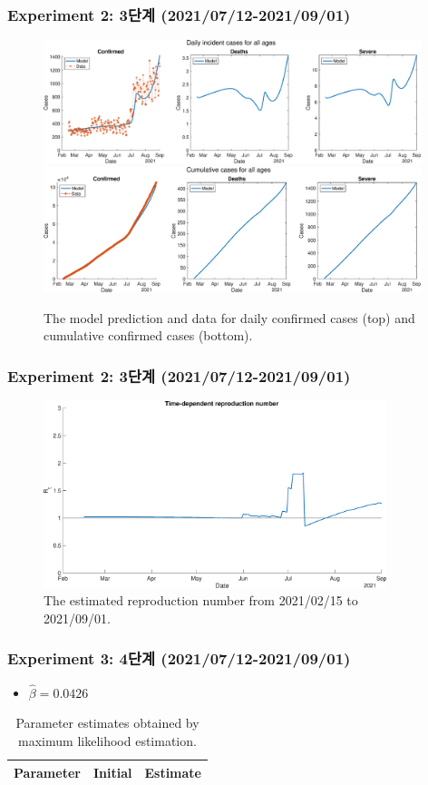 \documentclass[aspectratio=169, 9pt, xcolor=dvipsnames]{beamer}
\begin{document}
	\begin{frame}\frametitle{Experiment 2: 3단계 (2021/07/12-2021/09/01)}
	    \begin{figure}
	    	\centering
	    	\includegraphics[width=11cm]{../results/estimate_sd_2nd_2/daily_all_age.eps}
	    	\includegraphics[width=11cm]{../results/estimate_sd_2nd_2/cumul_all_age.eps}
	    	\caption{The model prediction and data for daily confirmed cases (top) and cumulative confirmed cases (bottom).}
	    \end{figure}
	\end{frame}

	\begin{frame}\frametitle{Experiment 2: 3단계 (2021/07/12-2021/09/01)}
	    \begin{figure}
	    	\centering
	    	\includegraphics[width=10cm]{../results/estimate_sd_2nd_2/rep_num.eps}
	    	\caption{The estimated reproduction number from 2021/02/15 to 2021/09/01.}
	    \end{figure}
	\end{frame}

	\begin{frame}\frametitle{Experiment 3: 4단계 (2021/07/12-2021/09/01)}
	    \begin{itemize}
			\item $\hat{\beta} = 0.0426$
		\end{itemize}
	    \begin{table}
	    	\begin{tabular}{crr}
	    		\toprule
	    		\textbf{Parameter} & \textbf{Initial} & \textbf{Estimate} \\
	    		\midrule
	    		
	    		\bottomrule
	    	\end{tabular}
	    	\caption{Parameter estimates obtained by maximum likelihood estimation.}
	    \end{table}
	\end{frame}
\end{document}
